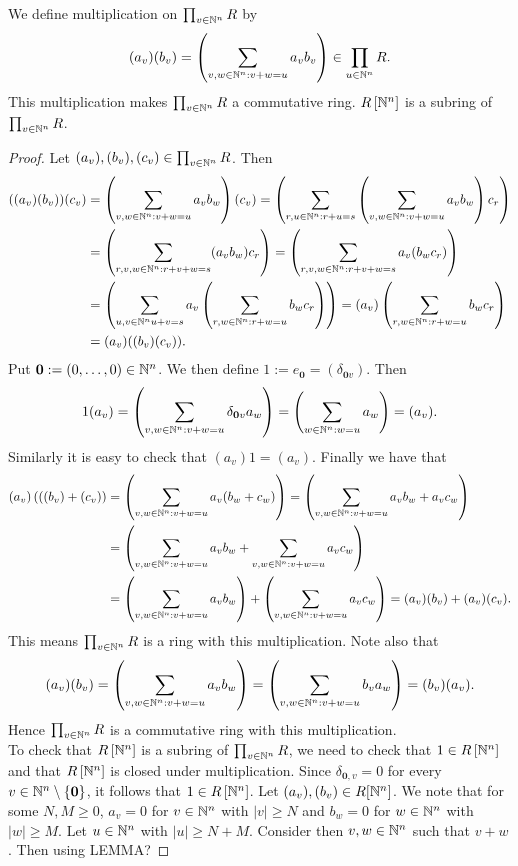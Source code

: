 \begin{lemma}
    We define multiplication on $\prod_{v\in \mathbb{N}^n} R$ by
    $$(a_v)(b_v)=\left( \sum_{v,w\in \mathbb{N}^n : v+w =u} a_vb_v \right)\in \prod_{u\in \mathbb{N}^n} R.$$
    This multiplication makes $\prod_{v\in \mathbb{N}^n} R$ a commutative ring. $R\left[\mathbb{N}^n\right]$ is a subring of $\prod_{v\in \mathbb{N}^n} R$.  
\end{lemma}
\begin{proof}
    Let $(a_v),(b_v),(c_v)\in \prod_{v\in \mathbb{N}^n} R$. Then 
    \begin{align*}
        ((a_v)(b_v))(c_v)&=\left(\sum_{v,w\in \mathbb{N}^n : v+w= u} a_vb_w\right)(c_v) =\left( \sum_{r,u\in \mathbb{N}^n : r+u=s} \left(\sum_{v,w\in \mathbb{N}^n : v+w = u} a_vb_w \right)c_r\right)\\
        &= \left( \sum_{r,v,w\in \mathbb{N}^n : r+v+w = s} (a_vb_w)c_r\right) = \left( \sum_{r,v,w\in \mathbb{N}^n : r+v+w = s} a_v(b_wc_r)\right)\\
        &= \left(\sum_{u,v\in \mathbb{N}^n u+v = s} a_v\left(\sum_{r,w\in \mathbb{N}^n : r+w =  u} b_wc_r \right)\right) = (a_v)\left(\sum_{r,w\in \mathbb{N}^n : r+w = u} b_wc_r \right)\\
        &= (a_v)((b_v)(c_v)). 
    \end{align*}
    Put $\mathbf{0}:= (0,\dots,0)\in \mathbb{N}^n$. We then define $1 := e_\mathbf{0} = (\delta_{\mathbf{0}v})$. Then 
    $$1(a_v) = \left(\sum_{v,w\in \mathbb{N}^n : v+w = u} \delta_{\mathbf{0}v} a_w \right) = \left(\sum_{w\in \mathbb{N}^n : w = u}  a_w \right) = (a_v).$$
    Similarly it is easy to check that $(a_v)1 = (a_v)$. Finally we have that 
    \begin{align*}
        (a_v)\left(((b_v)+(c_v)\right) &= \left(\sum_{v,w\in \mathbb{N}^n : v+w = u} a_v(b_w + c_w) \right) = \left(\sum_{v,w\in \mathbb{N}^n : v+w = u} a_vb_w + a_vc_w \right)\\ 
        &= \left(\sum_{v,w\in \mathbb{N}^n : v+w = u} a_vb_w + \sum_{v,w\in \mathbb{N}^n : v+w = u}a_vc_w \right)\\
        &= \left(\sum_{v,w\in \mathbb{N}^n : v+w = u} a_vb_w\right) + \left(\sum_{v,w\in \mathbb{N}^n : v+w = u}a_vc_w \right) = (a_v)(b_v)+(a_v)(c_v).
    \end{align*}
    This means $\prod_{v\in \mathbb{N}^n} R$ is a ring with this multiplication. Note also that
    $$(a_v)(b_v) = \left( \sum_{v,w\in \mathbb{N}^n : v+w =u} a_vb_w \right) =\left( \sum_{v,w\in \mathbb{N}^n : v+w =u} b_va_w \right)=(b_v)(a_v).$$
    Hence $\prod_{v\in \mathbb{N}^n} R$ is a commutative ring with this multiplication.\\
    To check that $R\left[\mathbb{N}^n\right]$ is a subring of $\prod_{v\in \mathbb{N}^n} R$, we need to check that $1\in R\left[\mathbb{N}^n\right]$ and that $R\left[\mathbb{N}^n\right]$ is closed under multiplication. Since $\delta_{\mathbf{0},v}=0$ for every $v\in \mathbb{N}^n \setminus \{\mathbf{0}\}$, it follows that $1\in R\left[\mathbb{N}^n\right]$. Let $(a_v),(b_v)\in R[\mathbb{N}^n]$. We note that for some $N,M\geq 0$, $a_v = 0$ for $v\in \mathbb{N}^n$ with $\vert v\vert \geq N$ and $b_w = 0$ for $w\in \mathbb{N}^n$ with $\vert w \vert \geq M$. Let $u\in \mathbb{N}^n$ with $\vert u\vert \geq N+M$. Consider then $v,w \in \mathbb{N}^n$ such that $v+w$. Then using {\LARGE LEMMA?}

\end{proof}
